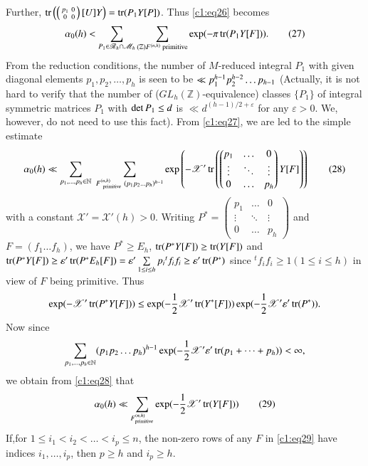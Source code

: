 Further, $\operatorname{tr}\left(\left(\begin{smallmatrix} p_{1} & 0\\ 0 & 0
\end{smallmatrix}\right)[U]Y\right)=\operatorname{tr}(P_{1}Y[P])$. Thus \eqref{c1:eq26}
becomes 
\begin{equation*}
\alpha_{0}(h)<\sum_{P_{1}\in \mathscr{R}_{h}\cap \mathscr{M}_{h}}
\sum_{(\mathbb{Z})F^{(n,h)}\text{ primitive}}\exp(-\pi
\operatorname{tr}(P_{1}Y[F])).\tag{27}\label{c1:eq27} 
\end{equation*}
From the reduction conditions, the number of $M$-reduced integral
$P_{1}$ with given diagonal elements $p_{1}, p_{2},\ldots,p_{h}$ is
seen to be $\ll p^{h-1}_{1}p^{h-2}_{2}\break\ldots p_{h-1}$ (Actually, it is
not hard to verify that the number of
($GL_{h}(\mathbb{Z})$-equivalence) classes $\{P_{1}\}$ of integral
symmetric matrices $P_{1}$ with $\det\break P_{1}\leq d$ is $\ll
d^{(h-1)/2+\varepsilon}$ for any $\varepsilon>0$. We, however, do not need
to use this fact). From \eqref{c1:eq27}, we are led to the simple estimate
{\fontsize{10}{12}\selectfont
\begin{equation*}
\alpha_{0}(h)\ll \sum_{p_{1},\ldots,p_{h}\in
  \mathbb{N}} \; \sum_{F^{(n,h)}_{\text{ \ primitive \ }} (p_{1}p_{2}\ldots
p_{h})^{h-1}}\exp \left(-\mathscr{X}'\operatorname{tr}\left(
\begin{pmatrix}
p_{1} & \ldots & 0\\
\vdots & \ddots & \vdots\\
0 & \ldots & p_{h}
\end{pmatrix}
Y[F]\right)\right)\tag{28}\label{c1:eq28}
\end{equation*}}\relax
with a constant $\mathscr{X}'=\mathscr{X}'(h)>0$. Writing
$P^{\ast}=\left(\begin{smallmatrix} p_{1} & \ldots & 0\\ \vdots &
  \ddots & \vdots\\ 0 & \ldots & p_{h}
\end{smallmatrix}\right)$ and $F=(f_{1}\ldots f_{h})$, we have
$P^{\ast}\geq E_{h}$, $\operatorname{tr}(P^{\ast}Y[F])\geq \operatorname{tr}(Y[F])$ and
$\operatorname{tr}(P^{\ast}Y[F])\geq
\varepsilon'\operatorname{tr}(P^{\ast}E_{h}[F])=\varepsilon'\sum\limits_{1\leq i\leq
  h}p_{i}{}^{t}f_{i}f_{i}\geq \varepsilon'\operatorname{tr}(P^{\ast})$ since
${}^{t}f_{i}f_{i}\geq 1(1\leq i\leq h)$ in view of $F$ being
primitive. Thus
$$
\exp(-\mathscr{X}'\operatorname{tr}(P^{\ast}Y[F]))\leq
\exp(-\frac{1}{2} \mathscr{X}' \operatorname{tr}(Y^{\ast}[F]))
\exp(-\frac{1}{2}\mathscr{X}'\varepsilon'\operatorname{tr}(P^{\ast})).  
$$
Now since 
$$
\sum\limits_{p_{1},\ldots,p_{h}\in
  \mathbb{N}}(p_{1}p_{2}\ldots
p_{h})^{h-1}\exp(-\frac{1}{2}\mathscr{X}'\varepsilon'\operatorname{tr}(p_{1}+\cdots+p_{h}))<\infty,  
$$
we obtain from \eqref{c1:eq28} that
\begin{equation*}
\alpha_{0}(h)\ll\sum_{F^{(n,h)}_{\text{primitive}}} \exp(-\frac{1}{2}\mathscr{X}'\operatorname{tr}(Y[F]))\tag{29}\label{c1:eq29} 
\end{equation*}
If,\pageoriginale for $1\leq i_{1}<i_{2}<\ldots<i_{p}\leq n$, the
non-zero rows of any $F$ in \eqref{c1:eq29} have indices
$i_{1},\ldots,i_{p}$, then $p\geq h$ and $i_{p}\geq h$.

